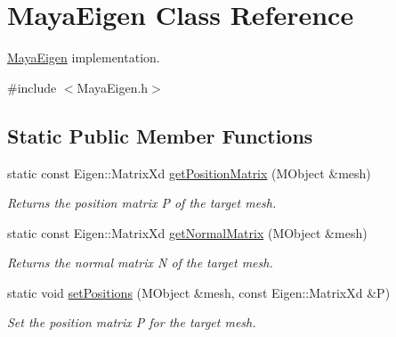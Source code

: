 \hypertarget{class_maya_eigen}{\section{Maya\+Eigen Class Reference}
\label{class_maya_eigen}
}


\hyperlink{class_maya_eigen}{Maya\+Eigen} implementation.  




{\ttfamily \#include $<$Maya\+Eigen.\+h$>$}

\subsection*{Static Public Member Functions}
\begin{DoxyCompactItemize}
\item 
\hypertarget{class_maya_eigen_a5fe0e509786f575294a664fb26d3611b}{static const Eigen\+::\+Matrix\+Xd \hyperlink{class_maya_eigen_a5fe0e509786f575294a664fb26d3611b}{get\+Position\+Matrix} (M\+Object \&mesh)}\label{class_maya_eigen_a5fe0e509786f575294a664fb26d3611b}

\begin{DoxyCompactList}\small\item\em Returns the position matrix P of the target mesh. \end{DoxyCompactList}\item 
\hypertarget{class_maya_eigen_a34cc35b57597c410c0ae9741cd33a045}{static const Eigen\+::\+Matrix\+Xd \hyperlink{class_maya_eigen_a34cc35b57597c410c0ae9741cd33a045}{get\+Normal\+Matrix} (M\+Object \&mesh)}\label{class_maya_eigen_a34cc35b57597c410c0ae9741cd33a045}

\begin{DoxyCompactList}\small\item\em Returns the normal matrix N of the target mesh. \end{DoxyCompactList}\item 
\hypertarget{class_maya_eigen_a71fba0ba861b1b579b32d59d9c24ad62}{static void \hyperlink{class_maya_eigen_a71fba0ba861b1b579b32d59d9c24ad62}{set\+Positions} (M\+Object \&mesh, const Eigen\+::\+Matrix\+Xd \&P)}\label{class_maya_eigen_a71fba0ba861b1b579b32d59d9c24ad62}

\begin{DoxyCompactList}\small\item\em Set the position matrix P for the target mesh. \end{DoxyCompactList}\end{DoxyCompactItemize}


